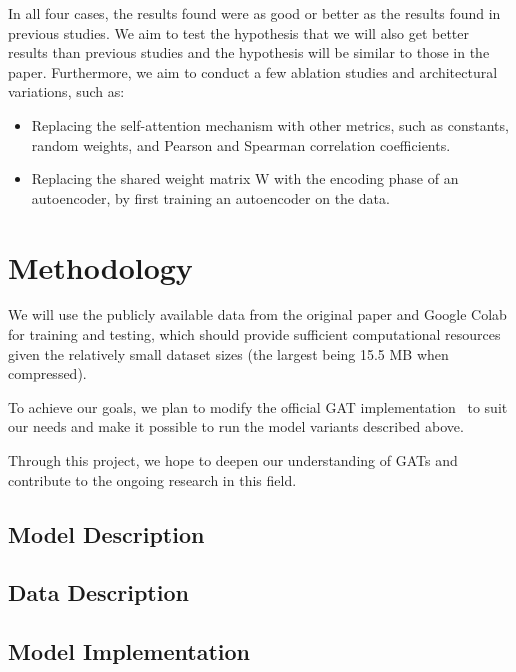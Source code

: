 \documentclass{article}
\begin{document}
    In all four cases, the results found were as good or better as the results found in previous studies.
    We aim to test the hypothesis that we will also get better results than previous studies and the hypothesis will
    be similar to those in the paper.
    Furthermore, we aim to conduct a few ablation studies and architectural
    variations, such as:
    \begin{itemize}
        \item Replacing the self-attention mechanism with other metrics, such as
    constants, random weights, and Pearson and Spearman correlation
    coefficients.
        \item Replacing the shared weight matrix W with the encoding phase of an
    autoencoder, by first training an autoencoder on the data.
    \end{itemize}

    \section{Methodology}\label{sec:methodology}
    We will use the publicly available data from the original paper and Google Colab for training and testing, which should provide sufficient computational resources given the relatively small dataset sizes (the largest being 15.5 MB when compressed).

    To achieve our goals, we plan to modify the official GAT implementation~\cite{petarvgatgithub} to suit our needs and make it
    possible to run the model variants described above.

    Through this project, we hope to deepen our understanding of GATs and contribute to the ongoing research in this field.


    \subsection{Model Description}\label{subsec:model-description}
    

    \subsection{Data Description}\label{subsec:data-description}
    

    \subsection{Model Implementation}\label{subsec:model-implementation}
    
\end{document}
